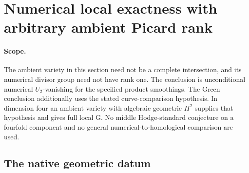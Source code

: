 \section{Numerical local exactness with arbitrary ambient Picard rank}
\label{r18pg:section}

\paragraph{Scope.}
The ambient variety in this section need not be a complete intersection,
and its numerical divisor group need not have rank one.  The conclusion
is unconditional numerical $U_2$-vanishing for the specified product
smoothings.  The Green conclusion additionally uses the stated
curve-comparison hypothesis.  In dimension four an ambient variety
with algebraic geometric $H^2$ supplies that hypothesis and gives full
local G.  No middle Hodge-standard conjecture on a fourfold component
and no general numerical-to-homological comparison are used.

\subsection{The native geometric datum}

